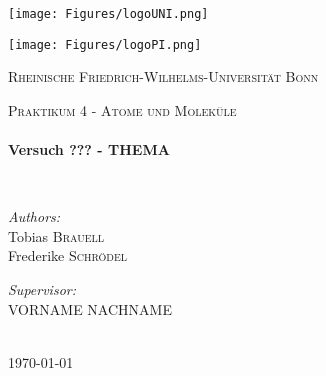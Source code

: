 \begin{titlepage}
  \thispagestyle{empty}
  \begin{center}

    \begin{minipage}{0.5\textwidth}
      \begin{flushleft}
	\texttt{[image: Figures/logoUNI.png]}
      \end{flushleft}
    \end{minipage}%
    \begin{minipage}{0.5\textwidth}
      \begin{flushright}
	\texttt{[image: Figures/logoPI.png]}
      \end{flushright}
    \end{minipage}
    
    \vspace{25 pt}
    
    \textsc{\LARGE Rheinische Friedrich-Wilhelms-Universität Bonn}\\[1.5 cm]
    
    \vspace{50 pt}
    
    \textsc{\Large Praktikum 4 - Atome und Moleküle}\\[0.5 cm]

    \HRule \\[0.4 cm]
    { \huge \bfseries Versuch ??? - THEMA \\[0.4 cm] }

    \HRule \\[1.5 cm]

    \noindent
    \begin{minipage}{0.4\textwidth}
      \begin{flushleft} \large
	\emph{Authors:}\\
	Tobias \textsc{Brauell}\\
	Frederike \textsc{Schrödel}
      \end{flushleft}
    \end{minipage}%
    \begin{minipage}{0.4\textwidth}
      \begin{flushright} \large
	\emph{Supervisor:} \\
	VORNAME \textsc{NACHNAME}
      \end{flushright}
    \end{minipage}

    \vfill

    \HRule \\[0.4 cm]
    {\large \today}

  \end{center}
\end{titlepage}